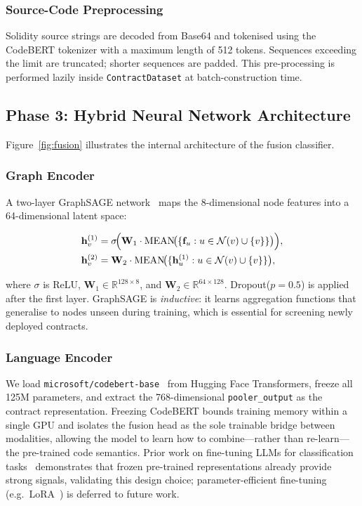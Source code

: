 \subsubsection{Source-Code Preprocessing}
Solidity source strings are decoded from Base64 and tokenised using the
CodeBERT tokenizer with a maximum length of 512 tokens.  Sequences
exceeding the limit are truncated; shorter sequences are padded.  This
pre-processing is performed lazily inside \texttt{ContractDataset}
at batch-construction time.

\subsection{Phase 3: Hybrid Neural Network Architecture}
\label{subsec:network}

Figure~\ref{fig:fusion} illustrates the internal architecture of the
fusion classifier.

\subsubsection{Graph Encoder}
A two-layer GraphSAGE network~\cite{hamilton2017graphsage} maps the
8-dimensional node features into a 64-dimensional latent space:

\begin{align}
\mathbf{h}_v^{(1)} &= \sigma\!\Bigl(
  \mathbf{W}_1 \cdot \mathrm{MEAN}\!\bigl(\{\mathbf{f}_u : u \in \mathcal{N}(v)\cup\{v\}\}\bigr)
\Bigr), \label{eq:sage1} \\
\mathbf{h}_v^{(2)} &= \mathbf{W}_2 \cdot \mathrm{MEAN}\!\bigl(
  \{\mathbf{h}_u^{(1)} : u \in \mathcal{N}(v)\cup\{v\}\}\bigr),
  \label{eq:sage2}
\end{align}

where $\sigma$ is ReLU, $\mathbf{W}_1 \in \mathbb{R}^{128 \times 8}$,
and $\mathbf{W}_2 \in \mathbb{R}^{64 \times 128}$.  Dropout($p=0.5$) is
applied after the first layer.  GraphSAGE is \emph{inductive}: it learns
aggregation functions that generalise to nodes unseen during training,
which is essential for screening newly deployed contracts.

\subsubsection{Language Encoder}
We load \texttt{microsoft/codebert-base}~\cite{feng2020codebert} from
Hugging Face Transformers, freeze all 125M parameters, and extract the
768-dimensional \texttt{pooler\_output} as the contract representation.
Freezing CodeBERT bounds training memory within a single GPU and isolates
the fusion head as the sole trainable bridge between modalities, allowing
the model to learn how to combine---rather than re-learn---the pre-trained
code semantics.  Prior work on fine-tuning LLMs for classification
tasks~\cite{poudel2026fakenews} demonstrates that frozen pre-trained
representations already provide strong signals, validating this design
choice; parameter-efficient fine-tuning (e.g.\ LoRA~\cite{hu2022lora})
is deferred to future work.

